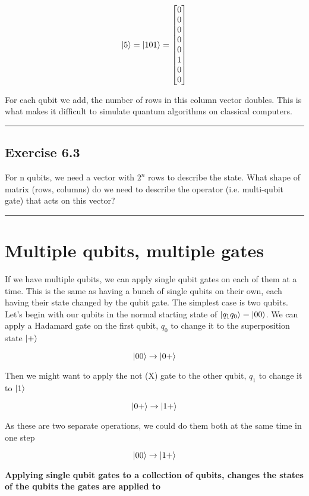\documentclass{book}
\begin{document}
$$ \ket{5} = \ket{101} = \begin{bmatrix} 0 \\ 0\\ 0\\ 0\\ 0\\ 1\\0\\0 \end{bmatrix} $$

For each qubit we add, the number of rows in this column vector doubles. This is what makes it difficult to simulate quantum algorithms on classical computers. \newline

\hrule

\subsection{Exercise 6.3}

For n qubits, we need a vector with $2^n$ rows to describe the state. What shape of matrix (rows, columns) do we need to describe the operator (i.e. multi-qubit gate) that acts on this vector? \newline

\hrule

\section{ Multiple qubits, multiple gates }


If we have multiple qubits, we can apply single qubit gates on each of them at a time. This is the same as having a bunch of single qubits on their own, each having their state changed by the qubit gate. The simplest case is two qubits. Let's begin with our qubits in the normal starting state of $\ket{q_1q_0} = \ket{00}$. We can apply a Hadamard gate on the first qubit, $q_0$ to change it to the superposition state $\ket{+}$

$$ \ket{00} \rightarrow \ket{0+} $$ 

Then we might want to apply the not (X) gate to the other qubit, $q_1$ to change it to $\ket{1}$

$$ \ket{0+} \rightarrow \ket{1+} $$

As these are two separate operations, we could do them both at the same time in one step 

$$  \ket{00} \rightarrow \ket{1+} $$

\textbf{Applying single qubit gates to a collection of qubits, changes the states of the qubits the gates are applied to}
\end{document}
